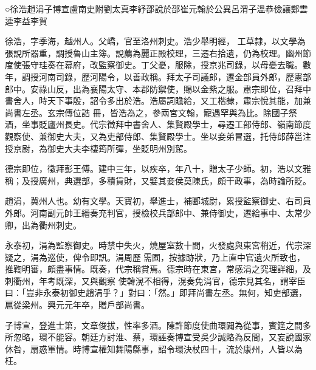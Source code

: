 
\begin{pinyinscope}

 ○徐浩趙涓子博宣盧南史附劉太真李紓邵說於邵崔元翰於公異呂渭子溫恭儉讓鄭雲逵李益李賀



 徐浩，字季海，越州人。父嶠，官至洛州刺史。浩少舉明經，
 工草隸，以文學為張說所器重，調授魯山主簿。說薦為麗正殿校理，三遷右拾遺，仍為校理。幽州節度使張守珪奏在幕府，改監察御史。丁父憂，服除，授京兆司錄，以母憂去職。數年，調授河南司錄，歷河陽令，以善政稱。拜太子司議郎，遷金部員外郎，歷憲部郎中。安祿山反，出為襄陽太守、本郡防禦使，賜以金紫之服。肅宗即位，召拜中書舍人，時天下事殷，詔令多出於浩。浩屬詞贍給，又工楷隸，肅宗悅其能，加兼尚書左丞。玄宗傳位誥
 冊，皆浩為之，參兩宮文翰，寵遇罕與為比。除國子祭酒，坐事貶廬州長史。代宗徵拜中書舍人、集賢殿學士，尋遷工部侍郎、嶺南節度觀察使、兼御史大夫，又為吏部侍郎、集賢殿學士。坐以妾弟冒選，托侍郎薛邕注授京尉，為御史大夫李棲筠所彈，坐貶明州別駕。



 德宗即位，徵拜彭王傅。建中三年，以疾卒，年八十，贈太子少師。初，浩以文雅稱；及授廣州，典選部，多積貨財，又嬖其妾侯莫陳氏，頗干政事，為時論所貶。



 趙涓，冀州人也。幼有文學。天寶初，舉進士，補郾城尉，累授監察御史、右司員外郎。河南副元帥王縉奏充判官，授檢校兵部郎中、兼侍御史，遷給事中、太常少卿，出為衢州刺史。



 永泰初，涓為監察御史。時禁中失火，燒屋室數十間，火發處與東宮稍近，代宗深疑之，涓為巡使，俾令即訊。涓周歷需囿，按據跡狀，乃上直中官遺火所致也，推鞫明審，頗盡事情。既奏，代宗稱賞焉。德宗時在東宮，常感涓之究理詳細，及刺衢州，年考既深，又與觀察
 使韓滉不相得，滉奏免涓官，德宗見其名，謂宰臣曰：「豈非永泰初御史趙涓乎？」對曰：「然。」即拜尚書左丞。無何，知吏部選，扈從梁州。興元元年卒，贈戶部尚書。



 子博宣，登進士第，文章俊拔，性率多酒。陳許節度使曲環闢為從事，賓筵之間多所忽略，環不能容。朝廷方討淮、蔡，環誣奏博宣受吳少誠賂為反間，又妄說國家休咎，扇惑軍情。時博宣權知舞陽縣事，詔令環決杖四十，流於康州，人皆以為枉。




\end{pinyinscope}
